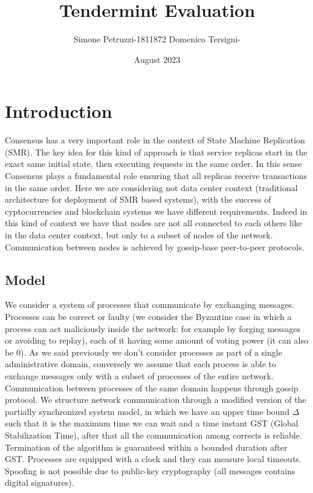 \documentclass{article}
\title{Tendermint Evaluation}
\author{Simone Petruzzi-1811872 Domenico Tersigni-}
\date{August 2023}
\begin{document}
   \maketitle
   \section{Introduction}
   Consensus has a very important role in the context of State Machine Replication (SMR). The key idea for this kind of approach is that service replicas start in the exact same initial state, then executing requests in the same order. In this sense Consensus plays a fundamental role ensuring that all replicas receive transactions in the same order.
   \newline
   \newline
   Here we are considering not data center context (traditional architecture for deployment of SMR based systems), with the success of cyptocurrencies and blockchain systems we have different requirements. Indeed in this kind of context we have that nodes are not all connected to each others like in the data center context, but only to a subset of nodes of the network. Communication between nodes is achieved by gossip-base peer-to-peer protocols.
   \subsection{Model}
   We consider a system of processes that communicate by exchanging messages. Processes can be correct or faulty (we consider the Byzantine case in which a process can act maliciously inside the network: for example by forging messages or avoiding to replay), each of it having some amount of voting power (it can also be 0). As we said previously we don't consider processes as part of a single administrative domain, conversely we assume that each process is able to exchange messages only with a subset of processes of the entire network. Communication between processes of the same domain happens through gossip protocol. We structure network communication through a modified version of the partially synchronized system model, in which we have an upper time bound $\Delta$ such that it is the maximum time we can wait and a time instant GST (Global Stabilization Time), after that all the communication among corrects is reliable. \\
   Termination of the algorithm is guaranteed within a bounded duration after GST. Processes are equipped with a clock and they can measure local timeouts. Spoofing is not possible due to public-key cryptography (all messages contains digital signatures).
\end{document}
